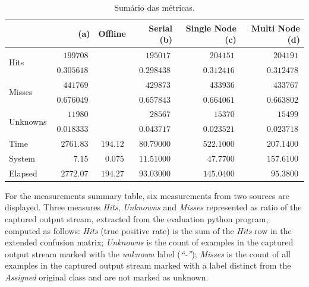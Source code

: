 \newcommand{\mr}[1]{\multirow{2}{*}{#1}}
\begin{table}[hbt]%
{\scriptsize
\setlength\tabcolsep{0.35em}
\caption{Sumário das métricas.}
\label{tab:exper-summary}
\begin{center}
\begin{tabular}{l|r|r|r|r|r}
                &  (a)  & Offline       & Serial (b)      & Single Node (c) & Multi Node (d)  \\\hline
\mr{Hits}       & $\ 199708\ $   &               & $\ 195017\ $    & $\ 204151\ $    & $\ 204191\ $    \\
                & $\ 0.305618\ $ &               & $\ 0.298438\ $  & $\ 0.312416\ $  & $\ 0.312478\ $  \\
\hline
\mr{Misses}     & $\ 441769\ $   &               & $\ 429873\ $    & $\ 433936\ $    & $\ 433767\ $    \\
                & $\ 0.676049\ $ &               & $\ 0.657843\ $  & $\ 0.664061\ $  & $\ 0.663802\ $  \\
\hline
\mr{Unknowns}   & $\ 11980\ $    &               & $\ 28567\ $     & $\ 15370\ $     & $\ 15499\ $     \\
                & $\ 0.018333\ $ &               & $\ 0.043717\ $  & $\ 0.023521\ $  & $\ 0.023718\ $  \\
\hline
Time            & $\ 2761.83\ $  & $\ 194.12\ $  & $\ 80.79000\ $  & $\ 522.1000\ $  & $\ 207.1400\ $  \\\hline
System          & $\ 7.15\ $     & $\  0.075\ $  & $\ 11.51000\ $  & $\  47.7700\ $  & $\ 157.6100\ $  \\\hline
Elapsed         & $\ 2772.07\ $  & $\ 194.27\ $  & $\ 93.03000\ $  & $\ 145.0400\ $  & $\  95.3800\ $  
\end{tabular}
\end{center}
}
\end{table}

For the measurements summary table, six measurements from two sources are displayed. Three
measures \emph{Hits}, \emph{Unknowns} and \emph{Misses} represented as ratio of
the captured output stream, extracted from the evaluation python program,
computed as follows:
\emph{Hits} (true positive rate) is the sum of the \emph{Hits} row in the
extended confusion matrix;
\emph{Unknowns} is the count of examples in the captured output stream marked
with the \emph{unknown} label (\emph{``-''});
\emph{Misses} is the count of all examples in the captured output stream marked
with a label distinct from the \emph{Assigned} original class and are not marked
as unknown.

